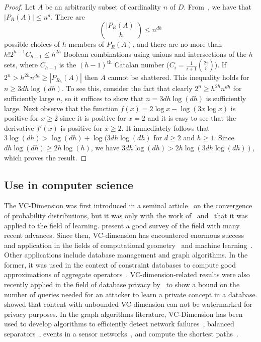 \begin{proof}
  Let $A$ be an arbitrarily subset of cardinality $n$ of $D$.
  From~\citep[Coroll.~14.4.2]{AlonS08}, we have that $|P_R(A)|\le n^d$. There are 
  \[
  \binom{|P_R(A)|}{h}\le  n^{dh} \]
  possible choices of $h$ members of $P_R(A)$, and there are no more
  than $ h! 2^{h-1} C_{h-1}\leq h^{2h}$
  Boolean combinations using unions and intersections of the $h$ sets, where
  $C_{h-1}$ is the $(h-1)^{\mathrm{th}}$ Catalan number
  ($C_i=\frac{1}{i+1}\binom{2i}{i}$). If $2^n> h^{2h}n^{dh} \geq |P_{R_h}(A)|$
  then $A$ cannot be shattered. This inequality holds for $n\ge 3dh\log(dh)$. To
  see this, consider the fact that clearly $2^n\ge h^{2h}n^{dh}$ for
  sufficiently large $n$, so it suffices to show that $n=3dh\log(dh)$ is
  sufficiently large. Next observe that the function $f(x)=2\log x-\log(3x\log
  x)$ is positive for $x\ge 2$ since it is positive for $x=2$ and it is easy to
  see that the derivative $f'(x)$ is positive for $x\ge 2$. It immediately
  follows that $3\log(dh)> \log(dh)+\log(3dh\log(dh)$ for $d\ge2$ and $h\ge1$.
  Since $dh\log(dh)\ge 2h\log(h)$, we have $3dh\log(dh)> 2h\log(3dh\log(dh))$,
  which proves the result.
\end{proof}

\subsection{Use in computer science}\label{sec:vcliterature}
The VC-Dimension was first introduced in a seminal
article~\citep{VapnikC71} on the convergence of probability distributions, but it
was only with the work of~\citet{HausslerW86} and~\citet{BlumerEHW89} that it
was applied to the field of learning. \citet{BoucheronBL05} present a good survey
of the field with many recent advances. Since then, VC-dimension has encountered
enormous success and application in the fields of computational
geometry~\citep{Chazelle00,Matousek02} and machine
learning~\citep{AnthonyB99,DevroyeGL96}. Other applications include
database management and graph algorithms. 
In the former, it was used in the context of constraint databases to compute
good approximations of aggregate operators~\citep{BenediktL02}.
VC-dimension-related results were also recently applied in the field of database
privacy by~\citet{BlumLR08} to show a bound on the number of queries needed for
an attacker to learn a private concept in a database. \citet{Gross11} showed
that content with unbounded VC-dimension can not be watermarked for privacy
purposes. In the graph algorithms literature, VC-Dimension has been used to
develop algorithms to efficiently detect network
failures~\citep{Kleinberg03,KleinbergSS08}, balanced separators~\citep{FeigeM06},
events in a sensor networks~\citep{GandhiSW10}, and compute the shortest
paths~\citep{AbrahamDFGW11}.

